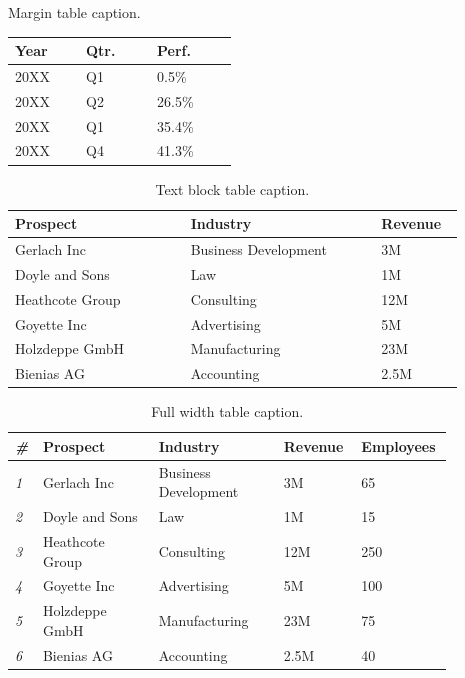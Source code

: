\documentclass[
	a4paper, %
	12pt, %
]{include/CSSullivanBusinessReport}
\begin{document}
\begin{margintable} %
	\footnotesize %
	\caption{Margin table caption.}
	\begin{tabular}{L{0.22\linewidth} C{0.22\linewidth} R{0.25\linewidth}}
		\toprule
		\textbf{Year} & \textbf{Qtr.} & \textbf{Perf.}\\
		\midrule
		20XX & Q1 & 0.5\%\\
		20XX & Q2 & 26.5\%\\
		20XX & Q1 & 35.4\%\\
		20XX & Q4 & 41.3\%\\
		\bottomrule
	\end{tabular}
\end{margintable}


\begin{table}[H] %
	\caption{Text block table caption.}
	\begin{tabular}{L{0.35\linewidth} L{0.38\linewidth} L{0.16\linewidth}}
		\toprule
		\textbf{Prospect} & \textbf{Industry} & \textbf{Revenue} \\
		\midrule
		Gerlach Inc & Business Development & 3M\\
		Doyle and Sons & Law & 1M\\
		Heathcote Group & Consulting & 12M\\
		Goyette Inc & Advertising & 5M\\
		Holzdeppe GmbH & Manufacturing & 23M\\
		Bienias AG & Accounting & 2.5M\\
		\bottomrule
	\end{tabular}
	\label{tab:example}
\end{table}


\begin{table} %
	\caption{Full width table caption.}
	\begin{tabular}{C{0.03\linewidth} L{0.25\linewidth} L{0.27\linewidth} L{0.16\linewidth} L{0.16\linewidth}}
		\toprule
		\textit{\#} & \textbf{Prospect} & \textbf{Industry} & \textbf{Revenue} & \textbf{Employees} \\
		\midrule
		\textit{1} & Gerlach Inc & Business Development & 3M & 65\\
		\textit{2} & Doyle and Sons & Law & 1M & 15\\
		\textit{3} & Heathcote Group & Consulting & 12M & 250\\
		\textit{4} & Goyette Inc & Advertising & 5M & 100\\
		\textit{5} & Holzdeppe GmbH & Manufacturing & 23M & 75\\
		\textit{6} & Bienias AG & Accounting & 2.5M & 40\\
		\bottomrule
	\end{tabular}
\end{table}
\end{document}
